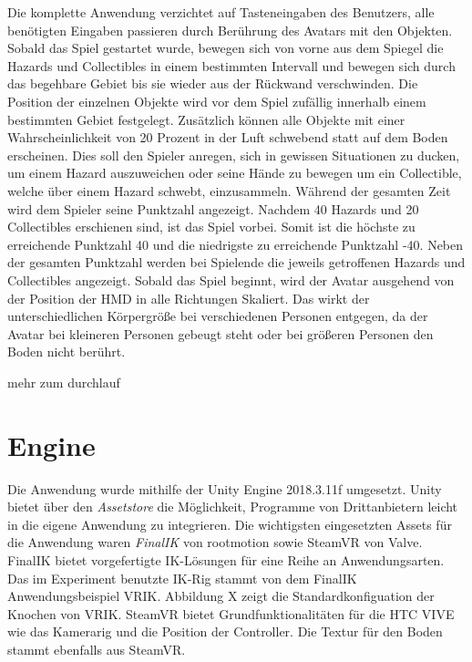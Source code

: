 Die komplette Anwendung verzichtet auf Tasteneingaben des Benutzers, alle benötigten Eingaben passieren durch Berührung des Avatars mit den Objekten.
Sobald das Spiel gestartet wurde, bewegen sich von vorne aus dem Spiegel die Hazards und Collectibles in einem bestimmten Intervall und bewegen sich durch das begehbare Gebiet bis sie wieder aus der Rückwand verschwinden. Die Position der einzelnen Objekte wird vor dem Spiel zufällig innerhalb einem bestimmten Gebiet festgelegt. Zusätzlich können alle Objekte mit einer Wahrscheinlichkeit von 20 Prozent in der Luft schwebend statt auf dem Boden erscheinen. Dies soll den Spieler anregen, sich in gewissen Situationen zu ducken, um einem Hazard auszuweichen oder seine Hände zu bewegen um ein Collectible, welche über einem Hazard schwebt, einzusammeln. Während der gesamten Zeit wird dem Spieler seine Punktzahl angezeigt. Nachdem 40 Hazards und 20 Collectibles erschienen sind, ist das Spiel vorbei. Somit ist die höchste zu erreichende Punktzahl 40 und die niedrigste zu erreichende Punktzahl -40. Neben der gesamten Punktzahl werden bei Spielende die jeweils getroffenen Hazards und Collectibles angezeigt.
Sobald das Spiel beginnt, wird der Avatar ausgehend von der Position der HMD in alle Richtungen Skaliert. Das wirkt der unterschiedlichen Körpergröße bei verschiedenen Personen entgegen, da der Avatar bei kleineren Personen gebeugt steht oder bei größeren Personen den Boden nicht berührt.

mehr zum durchlauf



\section{Engine}
Die Anwendung wurde mithilfe der Unity Engine 2018.3.11f umgesetzt.
Unity bietet über den \textit{Assetstore} die Möglichkeit, Programme von Drittanbietern leicht in die eigene Anwendung zu integrieren. Die wichtigsten eingesetzten Assets für die Anwendung waren \textit{FinalIK} von rootmotion\cite{rootmotion} sowie SteamVR von Valve. FinalIK bietet vorgefertigte IK-Lösungen für eine Reihe an Anwendungsarten. Das im Experiment benutzte IK-Rig stammt von dem FinalIK Anwendungsbeispiel VRIK. Abbildung X zeigt die Standardkonfiguation der Knochen von VRIK. SteamVR bietet Grundfunktionalitäten für die HTC VIVE wie das Kamerarig und die Position der Controller. Die Textur für den Boden stammt ebenfalls aus SteamVR.


